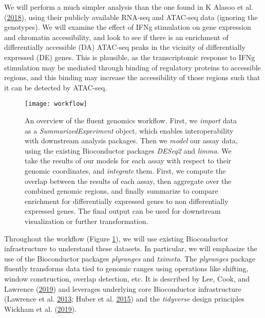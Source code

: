 \documentclass[
]{article}
\begin{document}
We will perform a much simpler analysis than the one found in K Alasoo et al. (\protect\hyperlink{ref-alasoo}{2018}), using
their publicly available RNA-seq and ATAC-seq data (ignoring the genotypes). We
will examine the effect of IFNg stimulation on gene expression and chromatin
accessibility, and look to see if there is an enrichment of differentially
accessible (DA) ATAC-seq peaks in the vicinity of differentially expressed (DE)
genes. This is plausible, as the transcriptomic response to IFNg stimulation
may be mediated through binding of regulatory proteins to accessible regions,
and this binding may increase the accessibility of those regions such that it
can be detected by ATAC-seq.

\begin{figure}

{\centering \texttt{[image: workflow]} 

}

\caption{An overview of the fluent genomics workflow. First, we \emph{import}
data as a \emph{SummarizedExperiment} object, which enables interoperability with
downstream analysis packages. Then we \emph{model} our assay data, using the
existing Bioconductor packages \emph{DESeq2} and \emph{limma}. We take the results of our
models for each assay with respect to their genomic coordinates, and
\emph{integrate} them. First, we compute the overlap between the results of each
assay, then aggregate over the combined genomic regions, and finally summarize
to compare enrichment for differentially expressed genes to non differentially
expressed genes. The final output can be used for downstream visualization or
further transformation.}\label{fig:workflow}
\end{figure}

Throughout the workflow (Figure \ref{fig:workflow}), we will use existing
Bioconductor infrastructure to understand these datasets. In particular, we
will emphasize the use of the Bioconductor packages \emph{plyranges} and \emph{tximeta}.
The \emph{plyranges} package fluently transforms data tied to genomic ranges using
operations like shifting, window construction, overlap detection, etc. It is
described by Lee, Cook, and Lawrence (\protect\hyperlink{ref-Lee2019}{2019}) and leverages underlying core Bioconductor infrastructure
(Lawrence et al. \protect\hyperlink{ref-granges}{2013}; Huber et al. \protect\hyperlink{ref-bioc}{2015}) and the \emph{tidyverse} design principles Wickham et al. (\protect\hyperlink{ref-tidyverse}{2019}).
\end{document}
